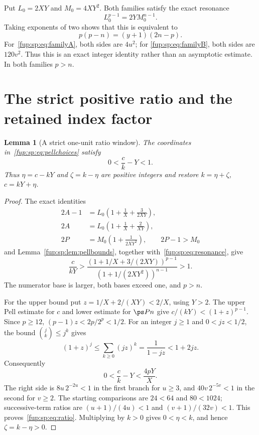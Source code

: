 \documentclass[11pt,letterpaper]{article}
\newtheorem{lemma}[theorem]{Lemma}
\theoremstyle{definition}\newtheorem{definition}[theorem]{Definition}
\theoremstyle{remark}\newtheorem{remark}[theorem]{Remark}
\begin{document}
Put $L_0=2XY$ and $M_0=4XY^2$. Both families satisfy the exact resonance
\begin{equation}
L_0^{p-1}=2Y M_0^{n-1}.
\label{fup:sp:eq:resonance}
\end{equation}
Taking exponents of two shows that this is equivalent to
\[
p(p-n)=(y+1)(2n-p).
\]
For~\eqref{fup:sp:eq:familyA}, both sides are $4u^2$; for
\eqref{fup:sp:eq:familyB}, both sides are $120v^2$.
Thus this is an exact integer identity rather than an asymptotic
estimate. In both families $p>n$.

\section{The strict positive ratio and the retained index factor}
\label{fup:sp:sec:ratio}
\begin{lemma}[A strict one-unit ratio window]
\label{fup:sp:lem:ratio}
The coordinates in~\eqref{fup:sp:eq:pellchoices} satisfy
\begin{equation}
0<\frac ck-Y<1.
\label{fup:sp:eq:ratio}
\end{equation}
Thus $\eta=c-kY$ and $\zeta=k-\eta$ are positive integers and restore
$k=\eta+\zeta$, $c=kY+\eta$.
\end{lemma}
\begin{proof}
The exact identities
\begin{align*}
2A-1&=L_0\left(1+\frac1X+\frac3{2XY}\right),\\
2A&=L_0\left(1+\frac1X+\frac2{XY}\right),\\
2P&=M_0\left(1+\frac1{2XY^2}\right),\qquad 2P-1>M_0
\end{align*}
and Lemma~\ref{fup:sp:lem:pellbounds}, together with~\eqref{fup:sp:eq:resonance},
give
\[
\frac c{kY}>
\frac{(1+1/X+3/(2XY))^{p-1}}
     {(1+1/(2XY^2))^{n-1}}>1.
\]
The numerator base is larger, both bases exceed one, and $p>n$.

For the upper bound put $z=1/X+2/(XY)<2/X$, using $Y>2$.
The upper Pell estimate for $c$ and lower estimate for $\ps P n$
give $c/(kY)<(1+z)^{p-1}$. Since $p\ge12$,
$(p-1)z<2p/2^p<1/2$. For an integer $j\ge1$ and $0<jz<1/2$,
the bound $\binom jk\le j^k$ gives
\[
(1+z)^j\le\sum_{k\ge0}(jz)^k
=\frac1{1-jz}<1+2jz.
\]
Consequently
\begin{equation}
0<\frac ck-Y<\frac{4pY}{X}.
\label{fup:sp:eq:ratiogap}
\end{equation}
The right side is $8u\,2^{-2u}<1$ in the first branch for $u\ge3$,
and $40v\,2^{-5v}<1$ in the second for $v\ge2$.
The starting comparisons are $24<64$ and $80<1024$; successive-term
ratios are $(u+1)/(4u)<1$ and $(v+1)/(32v)<1$.
This proves~\eqref{fup:sp:eq:ratio}. Multiplying by $k>0$ gives
$0<\eta<k$, and hence $\zeta=k-\eta>0$.
\end{proof}
\end{document}
